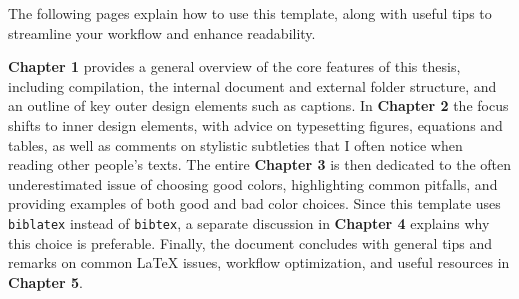 
The following pages explain how to use this template, along with useful tips to streamline your workflow and enhance readability. 

\textbf{Chapter 1} provides a general overview of the core features of this thesis, including compilation, the internal document and external folder structure, and an outline of key outer design elements such as captions. In \textbf{Chapter 2} the focus shifts to inner design elements, with advice on typesetting figures, equations and tables, as well as comments on stylistic subtleties that I often notice when reading other people’s texts. The entire \textbf{Chapter 3} is then dedicated to the often underestimated issue of choosing good colors, highlighting common pitfalls, and providing examples of both good and bad color choices. Since this template uses \verb|biblatex| instead of \verb|bibtex|, a separate discussion in \textbf{Chapter 4} explains why this choice is preferable. Finally, the document concludes with general tips and remarks on common LaTeX issues, workflow optimization, and useful resources in \textbf{Chapter 5}.
